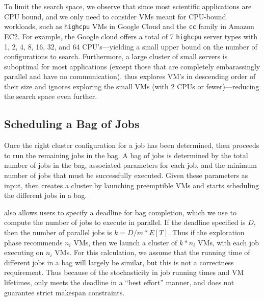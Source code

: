 
To limit the search space, we observe that since most scientific applications are CPU bound, and we only need to consider VMs meant for CPU-bound workloads, such as \texttt{highcpu} VMs in Google Cloud and the \texttt{cc} family in Amazon EC2.
For example, the Google cloud offers a total of 7 \texttt{highcpu} server types with 1, 2, 4, 8, 16, 32, and 64 CPU's---yielding a small upper bound on the number of configurations to search. 
Furthermore, a large cluster of small servers is suboptimal for most applications (except those that are completely embarassingly parallel and have no communication).
\sysname thus explores VM's in descending order of their size and ignores exploring the small VMs (with 2 CPUs or fewer)---reducing the search space even further. 



\subsection{Scheduling a Bag of Jobs}


Once the right cluster configuration for a job has been determined, \sysname then proceeds to run the remaining jobs in the bag.
A bag of jobs is determined by the total number of jobs in the bag, associated parameters for each job, and the minimum number of jobs that must be successfully executed.  
Given these parameters as input, \sysname then creates a cluster by launching preemptible VMs and starts scheduling the different jobs in a bag.

\sysname also allows users to specify a deadline for bag completion, which we use to compute the number of jobs to execute in parallel. If the deadline specified is $D$, then the number of parallel jobs is $k=D/m*E[T]$. Thus if the exploration phase recommends $n_i$ VMs, then we launch a cluster of $k*n_i$ VMs, with each job executing on $n_i$ VMs. 
For this calculation, we assume that the running time of different jobs in a bag will largely be similar, but this is not a correctness requirement.
Thus because of the stochasticity in job running times and VM lifetimes, \sysname only meets the deadline in a ``best effort'' manner, and does not guarantee strict makespan constraints. 

